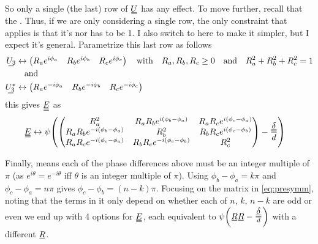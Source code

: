 \documentclass[11pt]{article}
\begin{document}
So only a single (the last) row of $\du{U}$ has any effect.
To move further, recall that the .
Thus, if we are only considering a single row, the only constraint that applies is that it's nor has to be 1.
I also switch to  here to make it simpler, but I expect it's general.
Parametrize this last row as follows
\begin{align}
    \su{U_3} &\leftrightarrow \begin{pmatrix} R_ae^{i\phi_a} & R_be^{i\phi_b} & R_ce^{i\phi_c} \end{pmatrix} \qq{with} R_a, R_b, R_c \geq 0 \qq{and} R_a^2 + R_b^2 + R_c^2 = 1 \\
    &\qq{and} \nonumber \\
    \su{U^*_3} &\leftrightarrow \begin{pmatrix} R_ae^{-i\phi_a} & R_be^{-i\phi_b} & R_ce^{-i\phi_c} \end{pmatrix}
\end{align}
this gives $\du{E}$ as
\begin{align}
    \du{E} &\leftrightarrow \psi \qty(\begin{pmatrix}
        R_a^2 & R_a R_b e^{i(\phi_b-\phi_a)} & R_a R_c e^{i(\phi_c-\phi_a)} \\
        R_a R_b e^{-i(\phi_b-\phi_a)} & R_b^2 & R_b R_c e^{i(\phi_c-\phi_b)} \\
        R_a R_c e^{-i(\phi_c-\phi_a)} & R_b R_c e^{-i(\phi_c-\phi_b)} & R_c^2
    \end{pmatrix} - \frac{\du{\delta}}{d}) \label{eq:presymm}
\end{align}

\pagebreak
Finally,  means each of the phase differences above must be an integer multiple of $\pi$ (as $e^{i\theta}=e^{-i\theta}$ iff $\theta$ is an integer multiple of $\pi$).
Using $\phi_b-\phi_a = k\pi$ and $\phi_c-\phi_a=n\pi$ gives $\phi_c-\phi_b=(n-k)\pi$.
Focusing on the matrix in \cref{eq:presymm}, noting that the terms in it only depend on whether each of $n$, $k$, $n-k$ are odd or even we end up with 4 options for $\du{E}$, each equivalent to $\psi\qty(\su{R}\su{R}-\frac{\du{\delta}}{d})$ with a different $\su{R}$.
\end{document}
